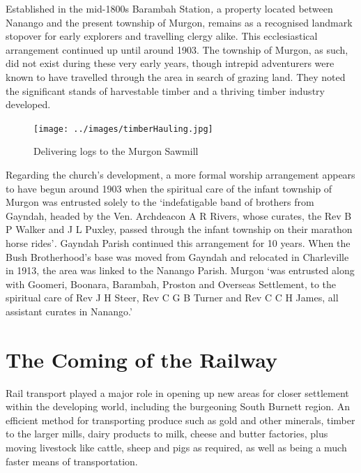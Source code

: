 Established in the mid-1800s Barambah Station\emph{,} a property located between Nanango and the present township of Murgon, remains as a recognised landmark stopover for early explorers and travelling clergy alike. This ecclesiastical arrangement continued up until around 1903. The township of Murgon, as such, did not exist during these very early years, though intrepid adventurers were known to have travelled through the area in search of grazing land. They noted the significant stands of harvestable timber and a thriving timber industry developed.









\begin{figure}
\begin{center}
\texttt{[image: ../images/timberHauling.jpg]}
\caption{Delivering logs to the Murgon Sawmill}
\end{center}
\end{figure}




Regarding the church's development, a more formal worship arrangement appears to have begun around 1903 when the spiritual care of the infant township of Murgon was entrusted solely to the `indefatigable band of brothers from Gayndah, headed by the Ven. Archdeacon A R Rivers, whose curates, the Rev B P Walker and J L Puxley, passed through the infant township on their marathon horse rides'\emph{.} Gayndah Parish continued this arrangement for 10 years. When the Bush Brotherhood's base was moved from Gayndah and relocated in Charleville in 1913, the area was linked to the Nanango Parish. Murgon `was entrusted along with Goomeri, Boonara, Barambah, Proston and Overseas Settlement, to the spiritual care of Rev J H Steer, Rev C G B Turner and Rev C C H James, all assistant curates in Nanango.'



\section{The Coming of the Railway}



Rail transport played a major role in opening up new areas for closer settlement within the developing world, including the burgeoning South Burnett region. An efficient method for transporting produce such as gold and other minerals, timber to the larger mills, dairy products to milk, cheese and butter factories, plus moving livestock like cattle, sheep and pigs as required, as well as being a much faster means of transportation.



